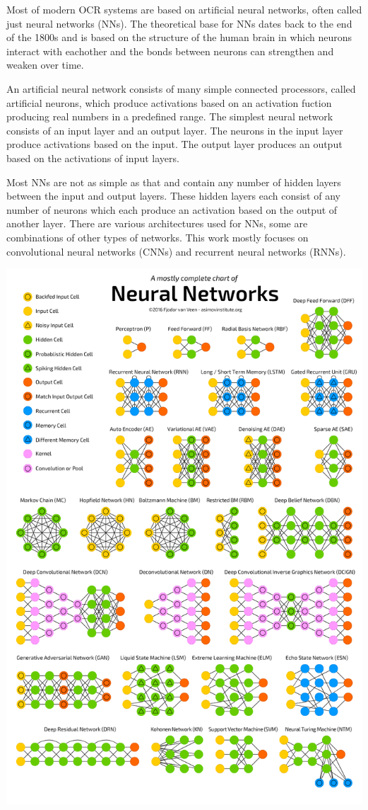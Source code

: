 \documentclass[12pt]{article}
\begin{document}
Most of modern OCR systems are based on artificial neural networks, often called just neural networks (NNs). The theoretical base for NNs dates back to the end of the 1800s and is based on the structure of the human brain in which neurons interact with eachother and the bonds between neurons can strengthen and weaken over time. ~\cite{SCHMIDHUBER201585}

An artificial neural network consists of many simple connected processors, called artificial neurons, which produce activations based on an activation fuction producing real numbers in a predefined range. The simplest neural network consists of an input layer and an output layer. The neurons in the input layer produce activations based on the input. The output layer produces an output based on the activations of input layers. ~\cite{SCHMIDHUBER201585}

Most NNs are not as simple as that and contain any number of hidden layers between the input and output layers. These hidden layers each consist of any number of neurons which each produce an activation based on the output of another layer. There are various architectures used for NNs, some are combinations of other types of networks. This work mostly focuses on convolutional neural networks (CNNs) and recurrent neural networks (RNNs). ~\cite{SCHMIDHUBER201585}

\includegraphics [width=\textwidth, height=\textheight, keepaspectratio] {neuralnetworks.png} ~\cite{netzoo}
\end{document}
